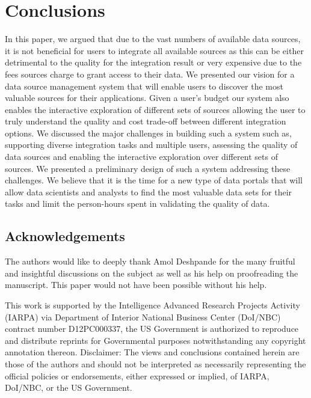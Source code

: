 \documentclass{sig-alternate}
\begin{document}
\section{Conclusions}
\label{sec:conclusion}
In this paper, we argued that due to the vast numbers of available data sources, it is not beneficial for users to integrate all available sources as this can be either detrimental to the quality for the integration result or very expensive due to the fees sources charge to grant access to their data. We presented our vision for a data source management system that will enable users to discover the most valuable sources for their applications. Given a user's budget our system also enables the interactive exploration of different sets of sources allowing the user to truly understand the quality and cost trade-off between different integration options. We discussed the major challenges in building such a system such as, supporting diverse integration tasks and multiple users, assessing the quality of data sources and enabling the interactive exploration over different sets of sources. We presented a preliminary design of such a system addressing these challenges. We believe that it is the time for a new type of data portals that will allow data scientists and analysts to find the most valuable data sets for their tasks and limit the person-hours spent in validating the quality of data. 

\subsection*{Acknowledgements}
The authors would like to deeply thank Amol Deshpande for the many fruitful and insightful discussions on the subject as well as his help on 
proofreading the manuscript. This paper would not have been possible without his help. 

This work is supported by the Intelligence Advanced Research Projects Activity (IARPA) via Department of Interior National Business Center (DoI/NBC) contract number D12PC000337, the US Government is authorized to reproduce and distribute reprints for Governmental purposes notwithstanding any copyright annotation thereon. Disclaimer: The views and conclusions contained herein are those of the authors and should
not be interpreted as necessarily representing the official policies or endorsements, either expressed or implied, of IARPA, DoI/NBC, or the
US Government.
\end{document}
